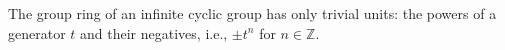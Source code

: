 The group ring of an infinite cyclic group has only trivial units: the powers of a generator $t$ and their negatives, i.e., $\pm t^n$ for $n \in \mathbb{Z}$.
